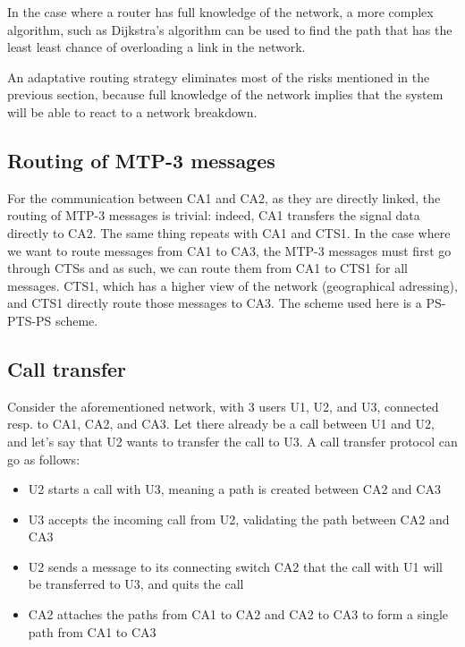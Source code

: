 \documentclass[lettersize,journal]{IEEEtran} %
\begin{document}
In the case where a router has full knowledge of the network, a more complex algorithm, such as Dijkstra's
algorithm can be used to find the path that has the least least chance of overloading a link in the network.

An adaptative routing strategy eliminates most of the risks mentioned in the previous section, because full
knowledge of the network implies that the system will be able to react to a network breakdown.

\subsection{Routing of MTP-3 messages}
For the communication between CA1 and CA2, as they are directly linked, the routing of MTP-3 messages is 
trivial: indeed, CA1 transfers the signal data directly to CA2. The same thing repeats with CA1 and CTS1.
In the case where we want to route messages from CA1 to CA3, the MTP-3 messages must first go through
CTSs and as such, we can route them from CA1 to CTS1 for all messages. CTS1, which has a higher view
of the network (geographical adressing), and CTS1 directly route those messages to CA3. The scheme used here is a PS-PTS-PS scheme. 

\subsection{Call transfer}
Consider the aforementioned network, with 3 users U1, U2, and U3, connected resp. to CA1, CA2, and CA3.
Let there already be a call between U1 and U2, and let's say that U2 wants to transfer the call to U3.
A call transfer protocol can go as follows: 
\begin{itemize}
        \item U2 starts a call with U3, meaning a path is created between CA2 and CA3
        \item U3 accepts the incoming call from U2, validating the path between CA2 and CA3
        \item U2 sends a message to its connecting switch CA2 that the call with U1 will be transferred to U3, and quits the call
        \item CA2 attaches the paths from CA1 to CA2 and CA2 to CA3 to form a single path from CA1 to CA3
\end{itemize}
\end{document}
